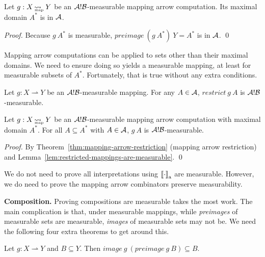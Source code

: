 \documentclass{llncs}
\renewcommand{\paragraph}[1]{\vspace{0.5\baselineskip}\noindent\textbf{{#1}.}\hspace{0.25\baselineskip}}
\newcommand{\arrow}{\rightsquigarrow}
\newcommand{\pto}{\rightharpoonup}
\newcommand{\gen}{_\mathrm{a}}
\newcommand{\map}{_\mathrm{map}}
\DeclareMathOperator{\mapto}{\arrow_{\mspace{-21mu}\map}}
\begin{document}
\begin{theorem}
Let $g : X \mapto Y$ be an $\mathcal{A}!\mathcal{B}$-measurable mapping arrow computation.
Its maximal domain $A^*$ is in $\mathcal{A}$.
\end{theorem}
\begin{proof}
Because $g~A^*$ is measurable, $preimage~(g~A^*)~Y = A^*$ is in $\mathcal{A}$.
\qed
\end{proof}

Mapping arrow computations can be applied to sets other than their maximal domains.
We need to ensure doing so yields a measurable mapping, at least for measurable subsets of $A^*$.
Fortunately, that is true without any extra conditions.

\begin{lemma}
\label{lem:restricted-mappings-are-measurable}
Let $g : X \pto Y$ be an $\mathcal{A}!\mathcal{B}$-measurable mapping.
For any $A \in \mathcal{A}$, $restrict~g~A$ is $\mathcal{A}!\mathcal{B}$-measurable.%
\end{lemma}

\begin{theorem}
\label{thm:restricted-computations-are-measurable}
Let $g : X \mapto Y$ be an $\mathcal{A}!\mathcal{B}$-measurable mapping arrow computation with maximal domain $A^*$.
For all $A \subseteq A^*$ with $A \in \mathcal{A}$, $g~A$ is $\mathcal{A}!\mathcal{B}$-measurable.
\end{theorem}
\begin{proof}
By Theorem~\ref{thm:mapping-arrow-restriction} (mapping arrow restriction) and Lemma~\ref{lem:restricted-mappings-are-measurable}.
\qed
\end{proof}

We do not need to prove all interpretations using $\meaningof{\cdot}\gen$ are measurable.
However, we do need to prove the mapping arrow combinators preserve measurability.

\paragraph{Composition}
Proving compositions are measurable takes the most work.
The main complication is that, under measurable mappings, while \emph{preimages} of measurable sets are measurable, \emph{images} of measurable sets may not be.
We need the following four extra theorems to get around this.

\begin{lemma}
\label{lem:images-of-preimages}
Let $g : X \pto Y$ and $B \subseteq Y$. Then $image~g~(preimage~g~B) \subseteq B$.%
\end{lemma}
\end{document}
